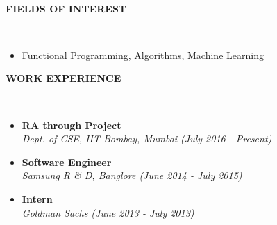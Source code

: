 \documentclass[a4paper,10pt]{article}
\newcommand{\lsep}{-0.5cm}
\newcommand{\resheading}[1]{{\small \colorbox{mygrey}{\begin{minipage}{0.975\textwidth}{\textbf{#1 \vphantom{p\^{E}}}}\end{minipage}}}}
\begin{document}
\hspace{0.5cm}\\[-0.2cm]

\vspace{3.8cm}


\resheading{\textbf{FIELDS OF INTEREST} }\\[\lsep]
\begin{itemize}
\item \noindent Functional Programming, Algorithms, Machine Learning
\end{itemize}

\resheading{\textbf{WORK EXPERIENCE} }\\[\lsep]
\begin{itemize}
	\item \noindent \textbf{RA through Project}\\
	\emph{Dept. of CSE, IIT Bombay, Mumbai \hfill (July 2016 - Present)}\\[-0.6cm]
	\item \noindent \textbf{Software Engineer}\\
	\emph{Samsung R & D, Banglore \hfill (June 2014 - July 2015)}\\[-0.6cm]
    \item \noindent \textbf{Intern}\\
	\emph{Goldman Sachs \hfill (June 2013 - July 2013)}\\[-0.4cm]
\end{itemize}
\end{document}
